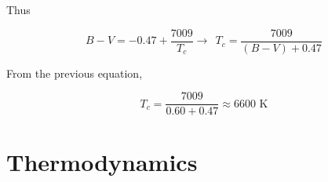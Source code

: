 \documentclass[11pt]{article}
\begin{document}
\begin{pproblem}
\begin{pssolution*}{}{}
\begin{alternativas}
        Thus

        \[B-V = -0.47 + \frac{7009}{T_c} \rightarrow \ \ \boxed{T_c = \frac{7009}{(B-V) + 0.47}}\]

        \item From the previous equation,
        
        \[\boxed{T_c = \frac{7009}{0.60 + 0.47} \approx 6600 \text{ K}}\]
    \end{alternativas}    

\end{pssolution*}
\end{pproblem}

\newpage

\section{Thermodynamics}
\end{document}
